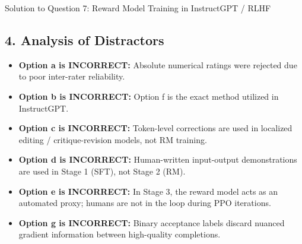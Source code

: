 \documentclass[11pt,a4paper]{article}
\begin{document}
\begin{solutionbox}{Solution to Question 7: Reward Model Training in InstructGPT / RLHF}
\subsection*{4. Analysis of Distractors}
\begin{itemize}[leftmargin=1.5em,itemsep=2pt]
    \item \textbf{Option a is INCORRECT:} Absolute numerical ratings were rejected due to poor inter-rater reliability.
    \item \textbf{Option b is INCORRECT:} Option f is the exact method utilized in InstructGPT.
    \item \textbf{Option c is INCORRECT:} Token-level corrections are used in localized editing / critique-revision models, not RM training.
    \item \textbf{Option d is INCORRECT:} Human-written input-output demonstrations are used in Stage 1 (SFT), not Stage 2 (RM).
    \item \textbf{Option e is INCORRECT:} In Stage 3, the reward model acts as an automated proxy; humans are not in the loop during PPO iterations.
    \item \textbf{Option g is INCORRECT:} Binary acceptance labels discard nuanced gradient information between high-quality completions.
\end{itemize}
\end{solutionbox}

\vspace{0.4cm}
\end{document}
